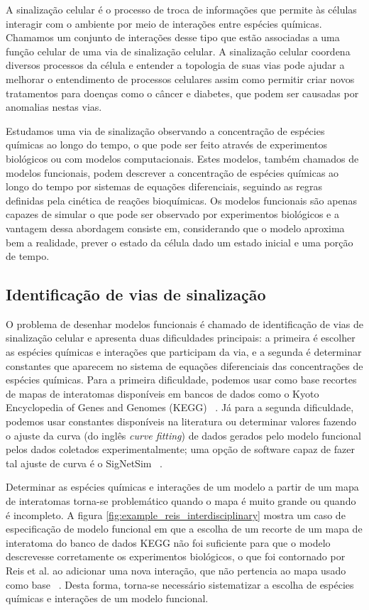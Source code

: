 \documentclass[12pt]{article}
\begin{document}
A sinalização celular é o processo de troca de informações que permite
às células interagir com o ambiente por meio de interações entre
espécies químicas. Chamamos um conjunto de interações desse tipo que 
estão associadas a uma função celular de uma via de sinalização celular.
A sinalização celular coordena diversos processos da célula e entender 
a topologia de suas vias pode ajudar a melhorar o entendimento de 
processos celulares assim como permitir criar novos tratamentos para 
doenças como o câncer e diabetes, que podem ser causadas por anomalias 
nestas vias.

Estudamos uma via de sinalização observando a concentração de espécies
químicas ao longo do tempo, o que pode ser feito através de experimentos
biológicos ou com modelos computacionais. Estes modelos, também
chamados de modelos funcionais, podem descrever a concentração de 
espécies químicas ao longo do tempo por sistemas de equações 
diferenciais, seguindo as regras definidas pela cinética de reações 
bioquímicas. Os modelos funcionais são apenas capazes de simular o que 
pode ser observado por experimentos biológicos e a vantagem dessa 
abordagem consiste em, considerando que o modelo aproxima bem a 
realidade, prever o estado da célula dado um estado inicial e uma porção
de tempo.

\subsection{Identificação de vias de sinalização}
O problema de desenhar modelos funcionais é chamado de identificação de
vias de sinalização celular e apresenta duas dificuldades principais: a 
primeira é escolher as espécies químicas e interações que participam da 
via, e a segunda é determinar constantes que aparecem no sistema de 
equações diferenciais das concentrações de espécies químicas. Para a 
primeira dificuldade, podemos usar como base recortes de mapas de 
interatomas disponíveis em bancos de dados como o Kyoto Encyclopedia of 
Genes and Genomes (KEGG) ~\cite{Kanehisa2000kegg}. Já para a segunda
dificuldade, podemos usar constantes disponíveis na literatura ou 
determinar valores fazendo o ajuste da curva (do inglês \emph{curve 
fitting}) de dados gerados pelo modelo funcional pelos dados coletados
experimentalmente; uma opção de software capaz de fazer tal ajuste de
curva é o SigNetSim ~\cite{Noel2017SigNetSim}.

Determinar as espécies químicas e interações de um modelo a partir de um
mapa de interatomas torna-se problemático quando o mapa é muito grande 
ou quando é incompleto. A figura 
\ref{fig:example_reis_interdisciplinary} mostra um caso de especificação
de modelo funcional em que a escolha de um recorte de um mapa de 
interatoma do banco de dados KEGG não foi suficiente para que o modelo 
descrevesse corretamente os experimentos biológicos, o que foi 
contornado por Reis et al. ao adicionar uma nova interação, que não 
pertencia ao mapa usado como base ~\cite{Reis2017interdisciplinary}.
Desta forma, torna-se necessário sistematizar a escolha de espécies 
químicas e interações de um modelo funcional.
\end{document}

